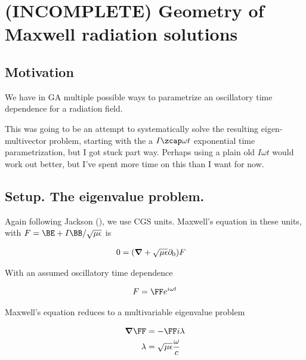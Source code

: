 

\chapter{(INCOMPLETE) Geometry of Maxwell radiation solutions}
\label{chap:radiationGeometry}
{}
\date{Aug 14, 2009}

\beginArtWithToc

\section{Motivation}

We have in GA multiple possible ways to parametrize an oscillatory time dependence for a radiation field.  

This was going to be an attempt to systematically solve the resulting eigen-multivector problem, starting with the a $I\zcap \omega t$ exponential time parametrization, but I got stuck part way.  Perhaps using a plain old $I \omega t$ would work out better, but I've spent more time on this than I want for now.

\section{Setup.  The eigenvalue problem.}

Again following Jackson (\cite{jackson1975cew}), we use CGS units.  Maxwell's equation in these units, with $F = \BE + I\BB/\sqrt{\mu\epsilon}$ is

\begin{align}\label{eqn:foo1}
0 &= (\boldsymbol{\nabla} + \sqrt{\mu\epsilon} \partial_0) F 
\end{align}

With an assumed oscillatory time dependence 

\begin{align}\label{eqn:foo2}
F = 
\FF 
e^{i\omega t}
\end{align}

Maxwell's equation reduces to a multivariable eigenvalue problem

\begin{align}\label{eqn:foo3}
\spacegrad \FF &= - \FF i \lambda \\
\lambda &= \sqrt{\mu\epsilon} \frac{\omega}{c} 
\end{align}

